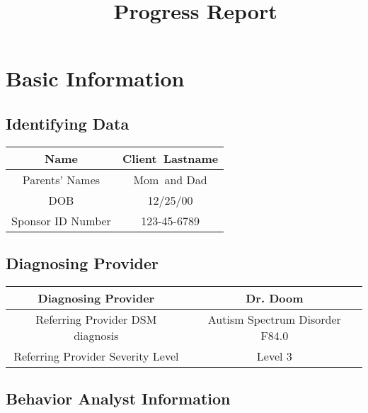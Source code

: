 \documentclass{article}
\title{\clientfirstname\ \clientlastname\ Progress Report}
\date{}
\def\clientfirstname{Client}
\def\clientlastname{Lastname}
\def\momname{Mom}
\def\dadname{Dad}
\def\DOB{12/25/00}
\def\SSN{123-45-6789}
\def\diagnosingProvider{Dr. Doom}
\def\diagnosis{Autism Spectrum Disorder F84.0}
\def\severity{Level 3}
\begin{document}
\tableofcontents
\newpage
\maketitle
\thispagestyle{fancy}

\section{Basic Information}

	\subsection{Identifying Data}

	\vspace{.5cm} %

		\begin{tabular}{|c||c|} %
		\hline\hline
		Name & \clientfirstname\ \clientlastname\\
		\hline\hline
		Parents' Names &  \momname\ and \dadname \\
		\hline\hline
		DOB & \DOB \\
		\hline\hline
		Sponsor ID Number & \SSN\\
		\hline\hline
		\end{tabular}

	\subsection{Diagnosing Provider}

	\vspace{.5cm}

		\begin{tabular}{|c||c|}
		\hline\hline
		Diagnosing Provider & \diagnosingProvider\\
		\hline\hline
		Referring Provider DSM diagnosis &  \diagnosis\\
		\hline\hline
		Referring Provider Severity Level & \severity\\
		\hline\hline
		\end{tabular}

	\subsection{Behavior Analyst Information}
\end{document}
